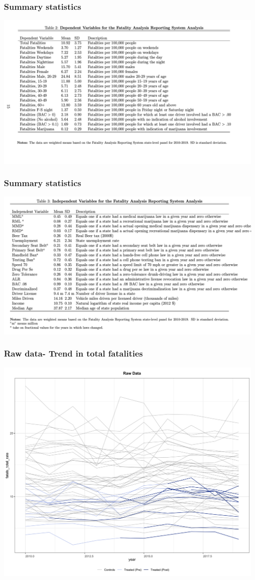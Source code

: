 \documentclass{beamer}
\begin{document}
\begin{frame} %
\frametitle{Summary statistics}
	\includegraphics[scale = 0.33]{table2}

	
\end{frame}
\begin{frame} %
\frametitle{Summary statistics}
	\includegraphics[scale = 0.33]{table3}

	
\end{frame}
\begin{frame} %
\frametitle{Raw data- Trend in total fatalities}
	\includegraphics[scale = 0.13]{raw_fatal_rate.png}
\end{frame}
\end{document}

